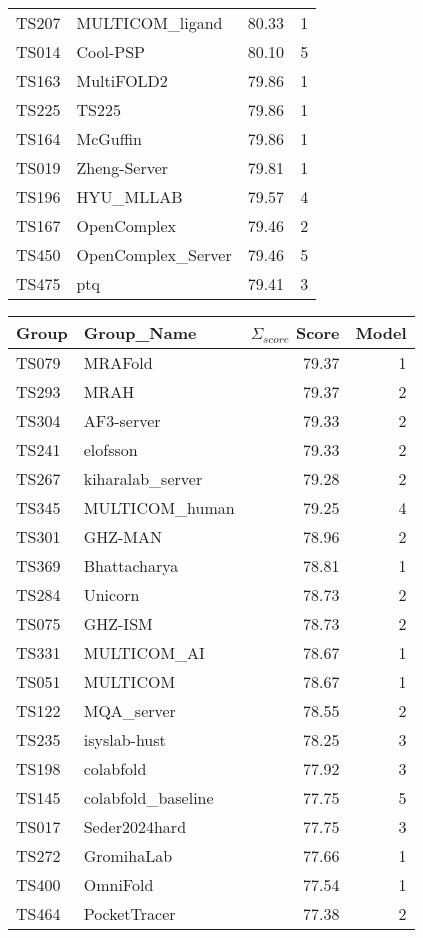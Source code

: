 \begin{table*}[ht]
\begin{minipage}[t]{0.48\textwidth}
\begin{tabular}{llrr}
TS207 & MULTICOM\_ligand & 80.33 & 1 \\ 
TS014 & Cool-PSP & 80.10 & 5 \\ 
TS163 & MultiFOLD2 & 79.86 & 1 \\ 
TS225 & TS225 & 79.86 & 1 \\ 
TS164 & McGuffin & 79.86 & 1 \\ 
TS019 & Zheng-Server & 79.81 & 1 \\ 
TS196 & HYU\_MLLAB & 79.57 & 4 \\ 
TS167 & OpenComplex & 79.46 & 2 \\ 
TS450 & OpenComplex\_Server & 79.46 & 5 \\ 
TS475 & ptq & 79.41 & 3 \\ 
\bottomrule
\end{tabular}
\end{minipage}
\hfill
\begin{minipage}[t]{0.48\textwidth}
\centering
\begin{tabular}{llrr}
\toprule
Group & Group\_Name & $\Sigma_{score}$ Score & Model \\ 
\midrule
TS079 & MRAFold & 79.37 & 1 \\ 
TS293 & MRAH & 79.37 & 2 \\ 
TS304 & AF3-server & 79.33 & 2 \\ 
TS241 & elofsson & 79.33 & 2 \\ 
TS267 & kiharalab\_server & 79.28 & 2 \\ 
TS345 & MULTICOM\_human & 79.25 & 4 \\ 
TS301 & GHZ-MAN & 78.96 & 2 \\ 
TS369 & Bhattacharya & 78.81 & 1 \\ 
TS284 & Unicorn & 78.73 & 2 \\ 
TS075 & GHZ-ISM & 78.73 & 2 \\ 
TS331 & MULTICOM\_AI & 78.67 & 1 \\ 
TS051 & MULTICOM & 78.67 & 1 \\ 
TS122 & MQA\_server & 78.55 & 2 \\ 
TS235 & isyslab-hust & 78.25 & 3 \\ 
TS198 & colabfold & 77.92 & 3 \\ 
TS145 & colabfold\_baseline & 77.75 & 5 \\ 
TS017 & Seder2024hard & 77.75 & 3 \\ 
TS272 & GromihaLab & 77.66 & 1 \\ 
TS400 & OmniFold & 77.54 & 1 \\ 
TS464 & PocketTracer & 77.38 & 2 \\ 

\end{tabular}
\end{minipage}
\end{table*}

